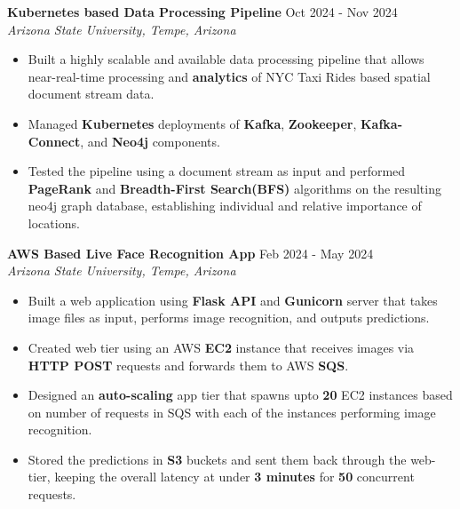 \documentclass[a4paper,9pt]{extarticle}
\begin{document}
\textbf{Kubernetes based Data Processing Pipeline}  \hfill Oct 2024 - Nov 2024\\ %
\textit{Arizona State University, Tempe, Arizona} %
\begin{itemize}
    \item Built a highly scalable and available data processing pipeline that allows near-real-time processing and \textbf{analytics} of NYC Taxi Rides based spatial document stream data.
    \item Managed \textbf{Kubernetes} deployments of \textbf{Kafka}, \textbf{Zookeeper}, \textbf{Kafka-Connect}, and \textbf{Neo4j} components.
    \item Tested the pipeline using a document stream as input and performed \textbf{PageRank} and \textbf{Breadth-First Search(BFS)} algorithms on the resulting neo4j graph database, establishing individual and relative importance of locations. 
    
\end{itemize}

\noindent
\textbf{AWS Based Live Face Recognition App}  \hfill Feb 2024 - May 2024\\ %
\textit{Arizona State University, Tempe, Arizona} %
\begin{itemize}
    \item Built a web application using \textbf{Flask API} and \textbf{Gunicorn} server that takes image files as input, performs image recognition, and outputs predictions.
    \item Created web tier using an AWS \textbf{EC2} instance that receives images via \textbf{HTTP POST} requests and forwards them to AWS \textbf{SQS}.
    \item Designed an \textbf{auto-scaling} app tier that spawns upto \textbf{20} EC2 instances based on number of requests in SQS with each of the instances performing image recognition.
    \item Stored the predictions in \textbf{S3} buckets and sent them back through the web-tier, keeping the overall latency at under \textbf{3 minutes} for \textbf{50} concurrent requests.
    
\end{itemize}
\end{document}
